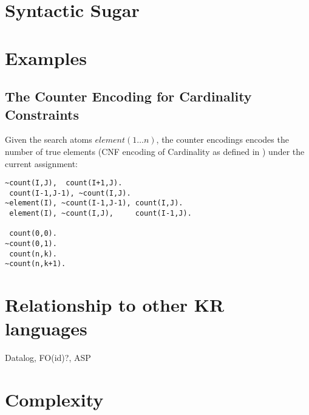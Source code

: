 \documentclass{new_tlp}
\begin{document}
\section{Syntactic Sugar}

\section{Examples}

\subsection{The Counter Encoding for Cardinality Constraints}


Given the search atoms $element(1\ldots n)$, the counter encodings encodes the
number of true elements (CNF encoding of Cardinality as defined in \cite{Sinz05})
under the current assignment:

\begin{lstlisting}
~count(I,J),  count(I+1,J).
 count(I-1,J-1), ~count(I,J).
~element(I), ~count(I-1,J-1), count(I,J).
 element(I), ~count(I,J),     count(I-1,J).

 count(0,0).
~count(0,1).
 count(n,k).
~count(n,k+1).
\end{lstlisting}

\section{Relationship to other KR languages}

Datalog, FO(id)?, ASP

\section{Complexity}



\end{document}
